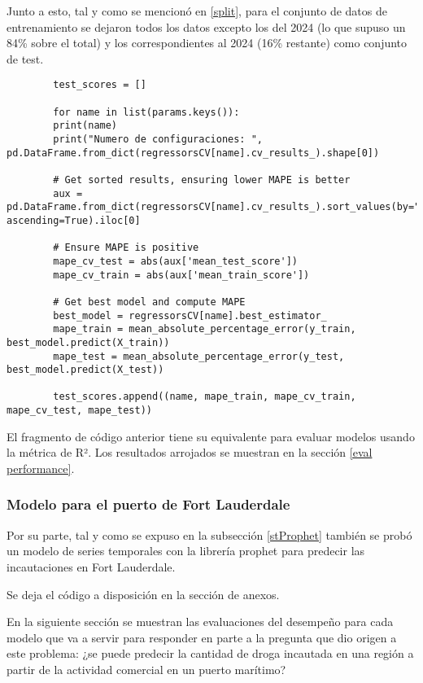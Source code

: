 \documentclass[12pt]{article}
\begin{document}
 	Junto a esto, tal y como se mencionó en \ref{split}, para el conjunto de datos de entrenamiento se dejaron todos los datos excepto los del 2024 (lo que supuso un 84\% sobre el total) y los correspondientes al 2024 (16\% restante) como conjunto de test.
 	
 	\begin{verbatim}
 		test_scores = []
 		
 		for name in list(params.keys()):
 		print(name)
 		print("Numero de configuraciones: ", pd.DataFrame.from_dict(regressorsCV[name].cv_results_).shape[0])
 		
 		# Get sorted results, ensuring lower MAPE is better
 		aux = pd.DataFrame.from_dict(regressorsCV[name].cv_results_).sort_values(by="mean_test_score", ascending=True).iloc[0]
 		
 		# Ensure MAPE is positive
 		mape_cv_test = abs(aux['mean_test_score'])
 		mape_cv_train = abs(aux['mean_train_score'])
 		
 		# Get best model and compute MAPE
 		best_model = regressorsCV[name].best_estimator_
 		mape_train = mean_absolute_percentage_error(y_train, best_model.predict(X_train))
 		mape_test = mean_absolute_percentage_error(y_test, best_model.predict(X_test))
 		
 		test_scores.append((name, mape_train, mape_cv_train, mape_cv_test, mape_test))
 	\end{verbatim}
 	El fragmento de código anterior tiene su equivalente para evaluar modelos usando la métrica de R². Los resultados arrojados se muestran en la sección \ref{eval performance}.
 	
 	
 	\subsubsection{\label{FL model} Modelo para el puerto de Fort Lauderdale}
 	
 	Por su parte, tal y como se expuso en la subsección \ref{stProphet} también se probó un modelo de series temporales con la librería prophet para predecir las incautaciones en Fort Lauderdale.
 	
 	Se deja el código a disposición en la sección de anexos.

 	En la siguiente sección se muestran las evaluaciones del desempeño para cada modelo que va a servir para responder en parte a la pregunta que dio origen a este problema: ¿se puede predecir la cantidad de droga incautada en una región a partir de la actividad comercial en un puerto marítimo?
\end{document}

